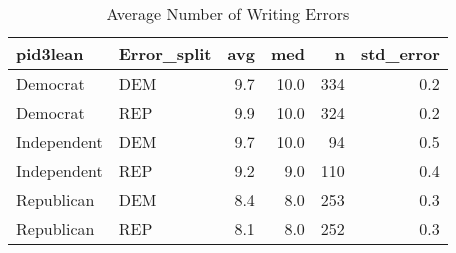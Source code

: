 \begin{table}[!htb]
\centering
\caption{Average Number of Writing Errors} 
\label{tab:error_sum_cces}
\begin{tabular}{llrrrr}
  \hline
pid3lean & Error\_split & avg & med & n & std\_error \\ 
  \hline
Democrat     & DEM & 9.7 & 10.0 & 334 & 0.2 \\ 
  Democrat     & REP & 9.9 & 10.0 & 324 & 0.2 \\ 
  Independent  & DEM & 9.7 & 10.0 & 94 & 0.5 \\ 
  Independent  & REP & 9.2 & 9.0 & 110 & 0.4 \\ 
  Republican   & DEM & 8.4 & 8.0 & 253 & 0.3 \\ 
  Republican   & REP & 8.1 & 8.0 & 252 & 0.3 \\ 
   \hline
\end{tabular}
\end{table}
